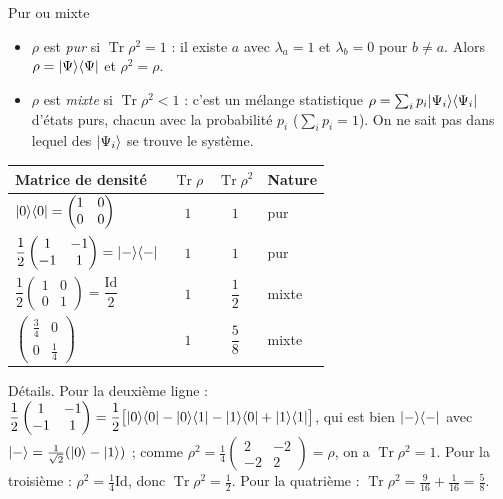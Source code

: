 \begin{definition}{Pur ou mixte}
\begin{itemize}[nosep]
  \item $\rho$ est \emph{pur} si $\operatorname{Tr}\rho^2=1$ : il existe $a$ avec
        $\lambda_a=1$ et $\lambda_b=0$ pour $b\neq a$. Alors $\rho=|\Psi\rangle\langle \Psi|$
        et $\rho^2=\rho$.
  \item $\rho$ est \emph{mixte} si $\operatorname{Tr}\rho^2<1$ : c'est un mélange
        statistique $\rho=\sum_ip_i|\Psi_i\rangle\langle \Psi_i|$ d'états purs, chacun avec la
        probabilité $p_i$ ($\sum_ip_i=1$). On ne sait pas dans lequel des $|\Psi_i\rangle$
        se trouve le système.
\end{itemize}
\end{definition}

\begin{center}
\begin{tabular}{@{}lccl@{}}
\toprule
\textbf{Matrice de densité} & $\operatorname{Tr}\rho$ & $\operatorname{Tr}\rho^2$ & \textbf{Nature} \\
\midrule
$|0\rangle\langle 0|=\begin{pmatrix}1 & 0\\ 0 & 0\end{pmatrix}$ & $1$ & $1$ & pur \\[1.6ex]
$\dfrac12\begin{pmatrix}1 & -1\\ -1 & 1\end{pmatrix}=|-\rangle\langle -|$ & $1$ & $1$ & pur \\[1.6ex]
$\dfrac12\begin{pmatrix}1 & 0\\ 0 & 1\end{pmatrix}=\dfrac{\mathrm{Id}}{2}$ & $1$ & $\dfrac12$ & mixte \\[1.6ex]
$\begin{pmatrix}\frac34 & 0\\ 0 & \frac14\end{pmatrix}$ & $1$ & $\dfrac58$ & mixte \\
\bottomrule
\end{tabular}
\end{center}

Détails. Pour la deuxième ligne :
$\dfrac12\begin{pmatrix}1 & -1\\ -1 & 1\end{pmatrix}
=\dfrac12\big[|0\rangle\langle 0|-|0\rangle\langle 1|-|1\rangle\langle 0|+|1\rangle\langle 1|\big]$,
qui est bien $|-\rangle\langle -|$ avec $|-\rangle=\frac{1}{\sqrt2}(|0\rangle-|1\rangle)$ ; comme
$\rho^2=\frac14\begin{pmatrix}2 & -2\\ -2 & 2\end{pmatrix}=\rho$, on a
$\operatorname{Tr}\rho^2=1$. Pour la troisième : $\rho^2=\frac14\mathrm{Id}$, donc
$\operatorname{Tr}\rho^2=\frac12$. Pour la quatrième :
$\operatorname{Tr}\rho^2=\frac{9}{16}+\frac1{16}=\frac58$.

